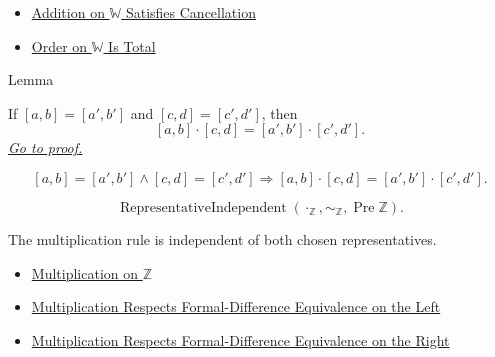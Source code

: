 \begin{dependencies}
\begin{itemize}
  \item \hyperref[thm:addition-on-w-cancellation]{Addition on $\mathbb{W}$ Satisfies Cancellation}
  \item \hyperref[thm:order-on-w-total]{Order on $\mathbb{W}$ Is Total}
\end{itemize}
\end{dependencies}

\begin{lemmabox}{Lemma}
\begin{lemma}
\label{lem:multiplication-on-z-classes-respects-equivalence}
If $[a,b]=[a',b']$ and $[c,d]=[c',d']$, then
\[
[a,b]\cdot[c,d]=[a',b']\cdot[c',d'].
\]
\hyperref[prf:multiplication-on-z-classes-respects-equivalence]{\textit{Go to proof.}}
\end{lemma}
\end{lemmabox}

\begin{remark*}
\[
[a,b]=[a',b']\land[c,d]=[c',d']
\Longrightarrow
[a,b]\cdot[c,d]=[a',b']\cdot[c',d'].
\]
\end{remark*}

\begin{remark*}
\[
\operatorname{RepresentativeIndependent}(\cdot_{\mathbb{Z}},\sim_{\mathbb{Z}},\operatorname{Pre}\mathbb{Z}).
\]
\end{remark*}

\begin{remark*}[Interpretation]
The multiplication rule is independent of both chosen representatives.
\end{remark*}

\begin{dependencies}
\begin{itemize}
  \item \hyperref[def:multiplication-on-z-classes]{Multiplication on $\mathbb{Z}$}
  \item \hyperref[lem:multiplication-on-z-classes-respects-left-equivalence]{Multiplication Respects Formal-Difference Equivalence on the Left}
  \item \hyperref[lem:multiplication-on-z-classes-respects-right-equivalence]{Multiplication Respects Formal-Difference Equivalence on the Right}
\end{itemize}
\end{dependencies}

